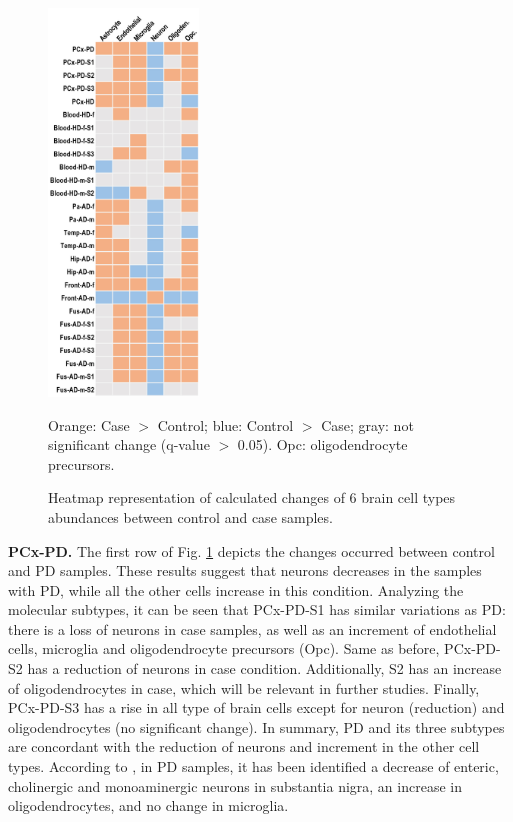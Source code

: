\begin{figure}[ht]
    \centerline{\includegraphics[width = 4cm]{Figures/brains.jpg}}
\caption{Heatmap representation of calculated changes of 6 brain cell types abundances between control and case samples.}
\footnotesize Orange: Case $>$ Control; blue: Control $>$ Case; gray: not significant change (q-value $>$ 0.05).
Opc: oligodendrocyte precursors.
\label{fig:bretigea}
\end{figure}

\textbf{PCx-PD.} The first row of Fig. \ref{fig:bretigea} depicts the changes occurred between control and PD samples. These results suggest that neurons decreases in the samples with PD, while all the other cells increase in this condition. Analyzing the molecular subtypes, it can be seen that PCx-PD-S1 has similar variations as PD: there is a loss of neurons in case samples, as well as an increment of endothelial cells, microglia and oligodendrocyte precursors (Opc). Same as before, PCx-PD-S2 has a reduction of neurons in case condition. Additionally, S2 has an increase of oligodendrocytes in case, which will be relevant in further studies. Finally, PCx-PD-S3 has a rise in all type of brain cells except for neuron (reduction) and oligodendrocytes (no significant change). In summary, PD and its three subtypes are concordant with the reduction of neurons and increment in the other cell types. According to \cite{bryois}, in PD samples, it has been identified a decrease of enteric, cholinergic and monoaminergic neurons in substantia nigra, an increase in oligodendrocytes, and no change in microglia.  

